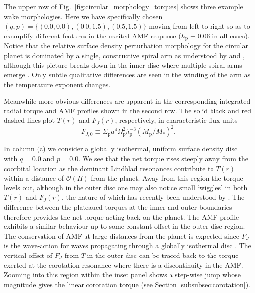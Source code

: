 The upper row of Fig.~\ref{fig:circular_morphology_torques} shows three example wake morphologies. Here we have specifically chosen $(q,p) = \lbrace(0.0,0.0), (0.0,1.5) , (0.5,1.5)\rbrace$ moving from left to right so as to exemplify different features in the excited AMF response ($h_\textrm{p} = 0.06$ in all cases). Notice that the relative surface density perturbation morphology for the circular planet is dominated by a single, constructive spiral arm as understood by \cite{OgilvieLubow_2003} and \citet{Rafikov2002a}, although this picture breaks down in the inner disc where multiple spiral arms emerge \citep{Bae2018,MirandaRafikov_2019a}. Only subtle qualitative differences are seen in the winding of the arm as the temperature exponent changes. 

Meanwhile more obvious differences are apparent in the corresponding integrated radial torque and AMF profiles shown in the second row. The solid black and red dashed lines plot $T(r)$ and $F_{J}(r)$, respectively, in characteristic flux units \citep{GoldreichTremaine_1980}
%
\begin{equation}
    F_{J,0} \equiv \Sigma_\textrm{p} a^4 \Omega_\textrm{p}^2 h_\textrm{p}^{-3} (M_\textrm{p}/M_*)^2.
    \label{eq:FJ0}
\end{equation}

In column (a) we consider a globally isothermal, uniform surface density disc with $q=0.0$ and $p=0.0$. We see that the net torque rises steeply away from the coorbital location as the dominant Lindblad resonances contribute to $T(r)$ within a distance of $\mathcal{O}(H)$ from the planet. Away from this region the torque levels out, although in the outer disc one may also notice small `wiggles' in both $T(r)$ and $F_J(r)$, the nature of which has recently been understood by \cite{CimermanEtAl_2024}. The difference between the plateaued torques at the inner and outer boundaries therefore provides the net torque acting back on the planet. The AMF profile exhibits a similar behaviour up to some constant offset in the outer disc region. The conservation of AMF at large distances from the planet is expected since $F_{J}$ is the wave-action for waves propagating through a globally isothermal disc \citep[see][]{MirandaRafikov_2020}. The vertical offset of $F_{J}$ from $T$ in the outer disc can be traced back to the torque exerted at the corotation resonance where there is a discontinuity in the AMF. Zooming into this region within the inset panel shows a step-wise jump whose magnitude gives the linear corotation torque (see Section \ref{subsubsec:corotation}).

